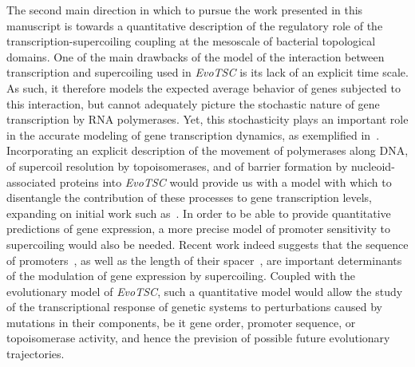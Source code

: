 The second main direction in which to pursue the work presented in this manuscript is towards a quantitative description of the regulatory role of the transcription-supercoiling coupling at the mesoscale of bacterial topological domains.
One of the main drawbacks of the model of the interaction between transcription and supercoiling used in \emph{EvoTSC} is its lack of an explicit time scale.
As such, it therefore models the expected average behavior of genes subjected to this interaction, but cannot adequately picture the stochastic nature of gene transcription by RNA polymerases.
Yet, this stochasticity plays an important role in the accurate modeling of gene transcription dynamics, as exemplified in~\cite{sevier2021}.
Incorporating an explicit description of the movement of polymerases along DNA, of supercoil resolution by topoisomerases, and of barrier formation by nucleoid-associated proteins into \emph{EvoTSC} would provide us with a model with which to disentangle the contribution of these processes to gene transcription levels, expanding on initial work such as~\cite{elhoudaigui2019}.
In order to be able to provide quantitative predictions of gene expression, a more precise model of promoter sensitivity to supercoiling would also be needed.
Recent work indeed suggests that the sequence of promoters~\citep{forquet2021}, as well as the length of their spacer~\citep{forquet2022}, are important determinants of the modulation of gene expression by supercoiling.
Coupled with the evolutionary model of \emph{EvoTSC}, such a quantitative model would allow the study of the transcriptional response of genetic systems to perturbations caused by mutations in their components, be it gene order, promoter sequence, or topoisomerase activity, and hence the prevision of possible future evolutionary trajectories.
